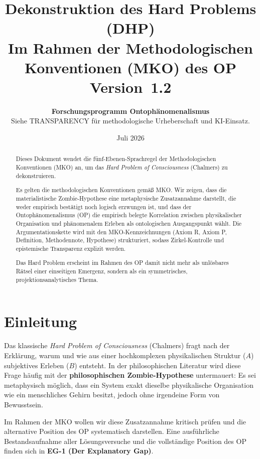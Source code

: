 \documentclass[11pt,a4paper]{article}
\title{
  \textbf{Dekonstruktion des Hard Problems (DHP)}\\[0.4em]
  {\large Im Rahmen der Methodologischen Konventionen (MKO) des OP}\\[0.5em]
  {\normalsize Version~1.2}
}
\author{
  \textbf{Forschungsprogramm Ontoph\"{a}nomenalismus}\\
  \small Siehe TRANSPARENCY f\"{u}r methodologische Urheberschaft und KI-Einsatz.
}
\date{Juli 2026}
\theoremstyle{definition}
\theoremstyle{plain}
\begin{document}
\maketitle

\begin{abstract}
Dieses Dokument wendet die f\"{u}nf-Ebenen-Sprachregel der Methodologischen Konventionen
(MKO) an, um das \emph{Hard Problem of Consciousness} (Chalmers) zu dekonstruieren.

Es gelten die methodologischen Konventionen gem\"{a}\ss{} MKO. Wir zeigen, dass die
materialistische Zombie-Hypothese eine metaphysische Zusatzannahme darstellt, die weder
empirisch best\"{a}tigt noch logisch erzwungen ist, und dass der Ontoph\"{a}nomenalismus
(OP) die empirisch belegte Korrelation zwischen physikalischer Organisation und
ph\"{a}nomenalem Erleben als ontologischen Ausgangspunkt w\"{a}hlt. Die
Argumentationskette wird mit den MKO-Kennzeichnungen (Axiom R, Axiom P, Definition,
Methodennote, Hypothese) strukturiert, sodass Zirkel-Kontrolle und epistemische
Transparenz explizit werden.

Das Hard Problem erscheint im Rahmen des OP damit nicht mehr als unlösbares R\"{a}tsel
einer einseitigen Emergenz, sondern als ein symmetrisches, projektionsanalytisches Thema.
\end{abstract}

\tableofcontents
\newpage

\section{Einleitung}

Das klassische \emph{Hard Problem of Consciousness} (Chalmers) fragt nach der
Erkl\"{a}rung, warum und wie aus einer hochkomplexen physikalischen Struktur ($A$)
subjektives Erleben ($B$) entsteht. In der philosophischen Literatur wird diese Frage
h\"{a}ufig mit der \textbf{philosophischen Zombie-Hypothese} untermauert: Es sei
metaphysisch m\"{o}glich, dass ein System exakt dieselbe physikalische Organisation wie
ein menschliches Gehirn besitzt, jedoch ohne irgendeine Form von Bewusstsein.

Im Rahmen der MKO wollen wir diese Zusatzannahme kritisch pr\"{u}fen und die alternative
Position des OP systematisch darstellen. Eine ausf\"{u}hrliche Bestandsaufnahme aller
L\"{o}sungsversuche und die vollst\"{a}ndige Position des OP finden sich in
\textbf{EG-1 (Der Explanatory Gap)}.
\end{document}
